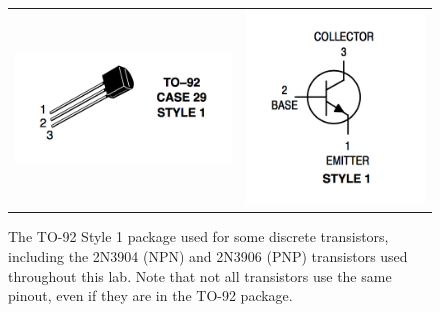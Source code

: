 \documentclass[12pt]{article}
\begin{document}
\begin{figure}[htbp]
\begin{center}
\begin{tabular}{c@{\hskip 2cm}c}
\includegraphics[height=0.10\textheight]{figs/case3904.png} &
\includegraphics[height=0.18\textheight]{figs/pinout3904.png} \\
\end{tabular}
\end{center}
\caption{The TO-92 Style 1 package used for some discrete transistors,
including the 2N3904 (NPN) and 2N3906 (PNP) transistors used throughout this lab.  Note that
not all transistors use the same pinout, even if they are in the TO-92
package.}
\label{fig:2n3904layout}
\end{figure}
\end{document}
